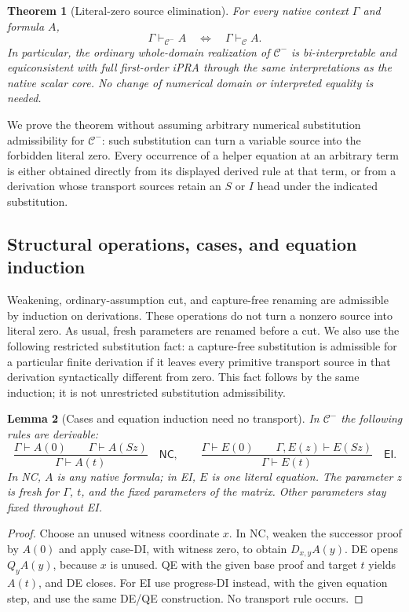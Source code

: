 \documentclass[11pt,letterpaper]{article}
\newtheorem{theorem}{Theorem}[section]
\newtheorem{lemma}[theorem]{Lemma}
\theoremstyle{definition}
\theoremstyle{remark}
\begin{document}
\begin{theorem}[Literal-zero source elimination]
\label{zs:main}
For every native context $\Gamma$ and formula $A$,
\[
 \Gamma\vdash_{\mathcal C^{-}}A
 \quad\Longleftrightarrow\quad
 \Gamma\vdash_{\mathcal C}A.
\]
In particular, the ordinary whole-domain realization of
$\mathcal C^{-}$ is bi-interpretable and equiconsistent with full
first-order iPRA through the same interpretations as the native scalar
core. No change of numerical domain or interpreted equality is needed.
\end{theorem}

We prove the theorem without assuming arbitrary numerical substitution
admissibility for $\mathcal C^{-}$: such substitution can turn a variable
source into the forbidden literal zero. Every occurrence of a helper
equation at an arbitrary term is either obtained directly from its
displayed derived rule at that term, or from a derivation whose transport
sources retain an $S$ or $I$ head under the indicated substitution.

\subsection{Structural operations, cases, and equation induction}

Weakening, ordinary-assumption cut, and capture-free renaming are
admissible by induction on derivations. These operations do not turn a
nonzero source into literal zero. As usual, fresh parameters are renamed
before a cut. We also use the following restricted substitution fact:
a capture-free substitution is admissible for a particular finite
derivation if it leaves every primitive transport source in that
derivation syntactically different from zero. This fact follows by the
same induction; it is not unrestricted substitution admissibility.

\begin{lemma}[Cases and equation induction need no transport]
\label{zs:cases-induction}
In $\mathcal C^{-}$ the following rules are derivable:
\[
 \frac{\Gamma\vdash A(0)\qquad\Gamma\vdash A(Sz)}
      {\Gamma\vdash A(t)}\quad\mathsf{NC},
 \qquad
 \frac{\Gamma\vdash E(0)\qquad\Gamma,E(z)\vdash E(Sz)}
      {\Gamma\vdash E(t)}\quad\mathsf{EI}.
\]
In NC, $A$ is any native formula; in EI, $E$ is one literal equation.
The parameter $z$ is fresh for $\Gamma$, $t$, and the fixed parameters
of the matrix. Other parameters stay fixed throughout EI.
\end{lemma}
\begin{proof}
Choose an unused witness coordinate $x$. In NC, weaken the successor
proof by $A(0)$ and apply case-DI, with witness zero, to obtain
$D_{x,y}A(y)$. DE opens $Q_yA(y)$, because $x$ is unused. QE with the
given base proof and target $t$ yields $A(t)$, and DE closes.
For EI use progress-DI instead, with the given equation step, and use
the same DE/QE construction. No transport rule occurs.
\end{proof}
\end{document}
